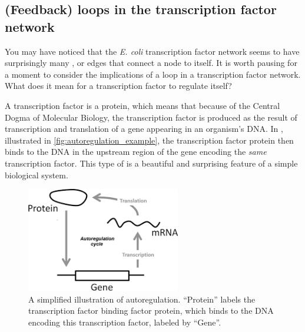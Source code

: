 \begin{qbox}\end{qbox}

\FloatBarrier
{}
\subsection{(Feedback) loops in the transcription factor network}

You may have noticed that the \textit{E. coli} transcription factor network seems to have surprisingly many , or edges that connect a node to itself. It is worth pausing for a moment to consider the implications of a loop in a transcription factor network. What does it mean for a transcription factor to regulate itself?

A transcription factor is a protein, which means that because of the Central Dogma of Molecular Biology, the transcription factor is produced as the result of transcription and translation of a gene appearing in an organism's DNA. In , illustrated in \autoref{fig:autoregulation_example}, the transcription factor protein then binds to the DNA in the upstream region of the gene encoding the \textit{same} transcription factor. This type of  is a beautiful and surprising feature of a simple biological system.\\

\begin{figure}[h]
\centering
\mySfFamily
\includegraphics[width = 0.6\textwidth]{../images/autoregulation_example.png}
\caption{A simplified illustration of autoregulation. ``Protein'' labels the transcription factor binding factor protein, which binds to the DNA encoding this transcription factor, labeled by ``Gene''.}
\label{fig:autoregulation_example}
\end{figure}

